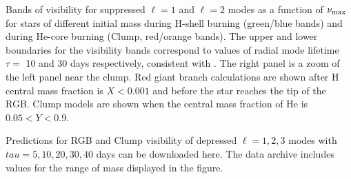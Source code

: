\label{fig:visibility} Bands of visibility for suppressed $\ell=1$ and $\ell=2$ modes as a function of $\nu_{\rm max}$ for stars of different initial mass during H-shell burning (green/blue bands) and during He-core burning (Clump, red/orange bands). The upper and lower boundaries for the visibility bands correspond to values of radial mode lifetime $\tau=$ 10 and 30 days respectively, consistent with \citet{Dupret_2009,Corsaro_2015}. The right panel is a zoom of the left panel near the clump. Red giant branch calculations are shown after H central mass fraction is $ X < 0.001$ and before the star reaches the tip of the RGB. Clump models are shown when the central mass fraction of He is $0.05 < Y < 0.9$.

Predictions for RGB and Clump visibility of depressed $\ell=1,2,3$ modes with $tau=5,10,20,30,40$ days can be downloaded here. The data archive includes values for the range of mass displayed in the figure.


  
  
  